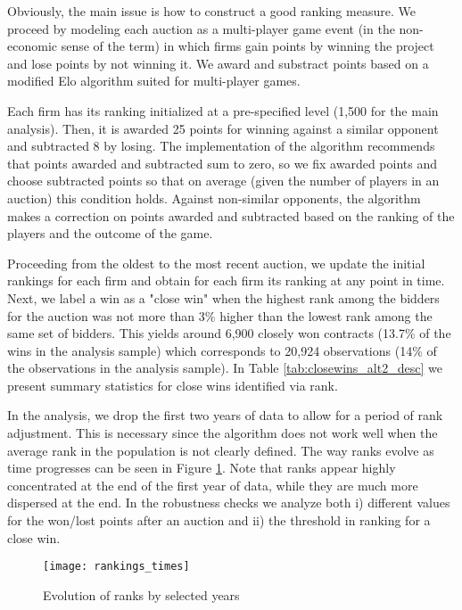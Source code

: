 Obviously, the main issue is how to construct a good ranking measure. We proceed by  modeling each auction as a multi-player game event (in the non-economic sense of the term) in which firms gain points by winning the project and lose points by not winning it. We award and substract points based on a modified Elo algorithm suited for multi-player games.

Each firm has its ranking initialized at a pre-specified level (1,500 for the main analysis). Then, it is awarded 25 points for winning against a similar opponent and subtracted 8 by losing. The implementation of the algorithm recommends that points awarded and subtracted sum to zero, so we fix awarded points and choose subtracted points so that on average (given the number of players in an auction) this condition holds. Against non-similar opponents, the algorithm makes a correction on points awarded and subtracted based on the ranking of the players and the outcome of the game.

Proceeding from the oldest to the most recent auction, we update the initial rankings for each firm and obtain for each firm its ranking at any point in time. Next, we label a win as a "close win" when the highest rank among the bidders for the auction was not more than 3\% higher than the lowest rank among the same set of bidders. This yields around  6,900 closely won contracts (13.7\% of the wins in the analysis sample) which corresponds to 20,924 observations (14\% of the observations in the analysis sample). In Table \ref{tab:closewins_alt2_desc} we present summary statistics for close wins identified via rank.



In the analysis, we drop the first two years of data to allow for a period of rank adjustment. This is necessary since the algorithm does not work well when the average rank in the population is not clearly defined. The way ranks evolve as time progresses  can be seen in Figure \ref{fig:rankings_times}. Note that ranks appear highly concentrated at the end of the first year of data, while they are much more dispersed at the end. In the robustness checks we analyze both i) different values for the won/lost points after an auction and ii) the threshold in ranking for a close win.

\begin{figure}
  \texttt{[image: rankings\_times]}
  \caption{Evolution of ranks by selected years}
  \label{fig:rankings_times}
  \vskip 0.5mm
  { \footnotesize \underline{ } \par}
\end{figure}

